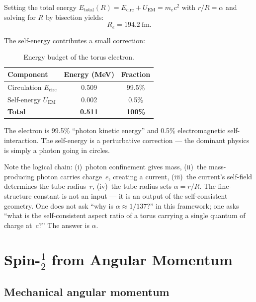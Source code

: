 \documentclass[11pt,a4paper]{article}
\begin{document}
Setting the total energy $E_{\text{total}}(R) = E_{\text{circ}} + U_{\text{EM}} = m_e c^2$ with $r/R = \alpha$ and solving for $R$ by bisection yields:
\begin{equation}
  R_e = 194.2~\text{fm}.
  \label{eq:Re}
\end{equation}

The self-energy contributes a small correction:

\begin{table}[h]
\centering
\begin{tabular}{@{}lcc@{}}
\toprule
Component & Energy (MeV) & Fraction \\
\midrule
Circulation $E_{\text{circ}}$ & 0.509 & 99.5\% \\
Self-energy $U_{\text{EM}}$ & 0.002 & 0.5\% \\
\midrule
\textbf{Total} & \textbf{0.511} & \textbf{100\%} \\
\bottomrule
\end{tabular}
\caption{Energy budget of the torus electron.}
\label{tab:energy-budget}
\end{table}

The electron is 99.5\% ``photon kinetic energy'' and 0.5\% electromagnetic self-interaction. The self-energy is a perturbative correction --- the dominant physics is simply a photon going in circles.

Note the logical chain: (i)~photon confinement gives mass, (ii)~the mass-producing photon carries charge~$e$, creating a current, (iii)~the current's self-field determines the tube radius~$r$, (iv)~the tube radius sets $\alpha = r/R$. The fine-structure constant is not an input --- it is an output of the self-consistent geometry. One does not ask ``why is $\alpha \approx 1/137$?'' in this framework; one asks ``what is the self-consistent aspect ratio of a torus carrying a single quantum of charge at~$c$?'' The answer is $\alpha$.

\section{Spin-\texorpdfstring{$\frac{1}{2}$}{1/2} from Angular Momentum}
\label{sec:spin}

\subsection{Mechanical angular momentum}
\end{document}
